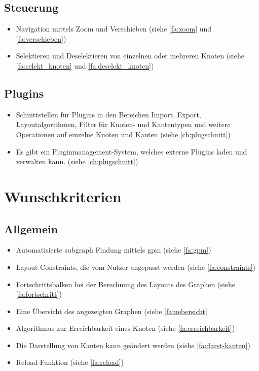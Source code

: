 \subsection{Steuerung}
  \begin{itemize}
    \item Navigation mittels Zoom und Verschieben (siehe \ref{fa:zoom} und \ref{fa:verschieben})
    \item Selektieren und Deselektieren von einzelnen oder mehreren Knoten (siehe \ref{fa:selekt_knoten} und \ref{fa:deselekt_knoten})
  \end{itemize}

\subsection{Plugins}
  \begin{itemize}
    \item Schnittstellen für Plugins in den Bereichen Import, Export, Layoutalgorithmen, Filter für Knoten- und Kantentypen und weitere Operationen auf einzelne Knoten und Kanten (siehe \autoref{ch:plugschnitt})
    \item Es gibt ein Pluginmanagement-System, welches externe Plugins laden und verwalten kann. (siehe \autoref{ch:plugschnitt})
  \end{itemize}

\section{Wunschkriterien}

\subsection{Allgemein}
  \begin{itemize}
    \item Automatisierte \gls{subgraph} Findung mittels \gls{gpm} (siehe \ref{fa:gpm})
    \item Layout Constraints, die vom Nutzer angepasst werden (siehe \ref{fa:constraints})
    \item Fortschrittsbalken bei der Berechnung des Layouts des Graphen (siehe \ref{fa:fortschritt})
    \item Eine Übersicht des angezeigten Graphen (siehe \ref{fa:uebersicht}
    \item Algorithmus zur Erreichbarkeit eines Knoten (siehe \ref{fa:erreichbarkeit})
    \item Die Darstellung von Kanten kann geändert werden (siehe \ref{fa:darst-kanten})
    \item Reload-Funktion (siehe \ref{fa:reload})
  \end{itemize}

